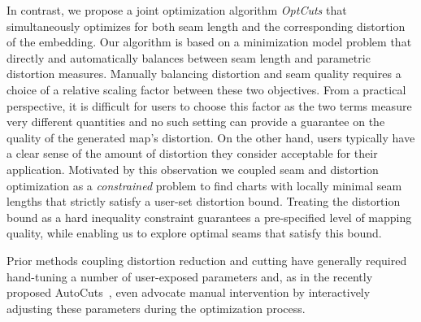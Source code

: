In contrast, we propose a joint optimization algorithm {\em OptCuts} that simultaneously optimizes for both seam length and the corresponding distortion of the embedding.
Our algorithm is based on a minimization model problem that directly and automatically balances between seam length and parametric distortion measures. Manually balancing distortion and seam quality requires a choice of a relative scaling factor between these two objectives. From a practical perspective, it is difficult for users to choose this factor as the two terms measure very different quantities and no such setting can provide a guarantee on the quality of the generated map's distortion. 
On the other hand, users typically have a clear sense of the amount of distortion they consider acceptable for their application. Motivated by this observation we   coupled seam and distortion optimization as a \emph{constrained} problem to find charts with locally minimal seam lengths that strictly satisfy a user-set distortion bound. Treating the distortion bound as a hard inequality constraint guarantees a pre-specified level of mapping quality, while enabling us to explore optimal seams that satisfy this bound. %

Prior methods coupling distortion reduction and cutting have generally required hand-tuning a number of user-exposed parameters and, as in the recently proposed AutoCuts~\cite{Poranne2017Autocuts}, even advocate manual intervention by interactively adjusting these parameters during the optimization process. 


